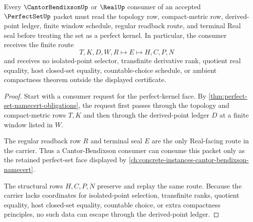 \begin{theorem}
\label{thm:perfect-set-derived-point-nonescape}
Every $\CantorBendixsonUp$ or $\RealUp$ consumer of an accepted $\PerfectSetUp$ packet must read the topology row, compact-metric row, derived-point ledger, finite window schedule, regular readback route, and terminal Real seal before treating the set as a perfect kernel. In particular, the consumer receives the finite route
$$
T,K,D,W,R \longmapsto E \longmapsto H,C,P,N
$$
and receives no isolated-point selector, transfinite derivative rank, quotient real equality, host closed-set equality, countable-choice schedule, or ambient compactness theorem outside the displayed certificate.
\end{theorem}
\begin{proof}
Start with a consumer request for the perfect-kernel face. By \autoref{thm:perfect-set-namecert-obligations}, the request first passes through the topology and compact-metric rows $T,K$ and then through the derived-point ledger $D$ at a finite window listed in $W$.

The regular readback row $R$ and terminal seal $E$ are the only Real-facing route in the carrier. Thus a Cantor-Bendixson consumer can consume this packet only as the retained perfect-set face displayed by \autoref{ch:concrete-instances-cantor-bendixson-namecert}.

The structural rows $H,C,P,N$ preserve and replay the same route. Because the carrier lacks coordinates for isolated-point selection, transfinite ranks, quotient equality, host closed-set equality, countable choice, or extra compactness principles, no such data can escape through the derived-point ledger.
\end{proof}


\begin{closurestatus}{\PerfectSetUp}
  \theoryclosure{\seedClosure}
  \formalstatus{\unformalizedV}
\end{closurestatus}
